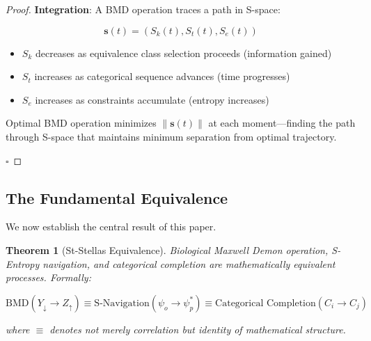 \documentclass[12pt,a4paper]{article}
\newtheorem{theorem}{Theorem}[section]
\begin{document}
\begin{proof}
\textbf{Integration}: A BMD operation traces a path in S-space:

\begin{equation}
\mathbf{s}(t) = (S_k(t), S_t(t), S_e(t))
\end{equation}

\begin{itemize}
\item $S_k$ decreases as equivalence class selection proceeds (information gained)
\item $S_t$ increases as categorical sequence advances (time progresses)
\item $S_e$ increases as constraints accumulate (entropy increases)
\end{itemize}

Optimal BMD operation minimizes $\|\mathbf{s}(t)\|$ at each moment—finding the path through S-space that maintains minimum separation from optimal trajectory.

$\square$
\end{proof}

\subsection{The Fundamental Equivalence}

We now establish the central result of this paper.

\begin{theorem}[St-Stellas Equivalence]
\label{thm:stellas_equivalence}
Biological Maxwell Demon operation, S-Entropy navigation, and categorical completion are mathematically equivalent processes. Formally:

\begin{equation}
\text{BMD}(Y_{\downarrow} \to Z_{\uparrow}) \equiv \text{S-Navigation}(\psi_o \to \psi_p^*) \equiv \text{Categorical Completion}(C_i \to C_j)
\end{equation}

where $\equiv$ denotes not merely correlation but identity of mathematical structure.
\end{theorem}
\end{document}
